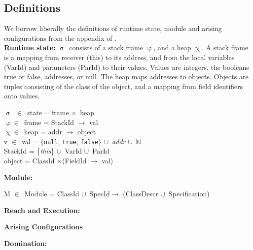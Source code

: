 \documentclass[a4paper,11pt, twoside,twocolumn]{article}
\newenvironment{logic}[1][null]
{\begin{flushleft} \small \label{#1}}
{\end{flushleft}}
\newcommand{\loin}{$\in$}
\newcommand{\losigma}{$\upsigma$}
\newcommand{\lochi}{$\upchi$}
\newcommand{\lophi}{$\upvarphi$}
\newcommand{\locup} {$\cup$}
\newcommand{\lotimes} {$\times$}
\newcommand{\ablock} {\null\qquad}
\begin{document}
\subsection{Definitions}\noindent
We borrow liberally the definitions of runtime state, module and arising configurations from the appendix of \cite{drossopoulou2015b}.\\
\textbf{Runtime state:}
 \losigma\ consists of a stack frame \lophi, and a heap \lochi. A stack frame is a mapping from receiver (this) to its address, and from the local variables (VarId) and parameters (ParId) to their values. Values are integers, the booleans true or false, addresses, or null. The heap maps addresses to objects. Objects are tuples consisting of the class of the object, and a mapping from field identifiers onto values.
\begin{logic}[Runtime state]
\losigma\ \loin\ state = frame \lotimes\ heap \\
\lophi \loin\ frame = StackId $\rightarrow$ val \\
\lochi \loin\ heap = addr $\rightarrow$ object \\
v \loin\ val = \{\texttt{null}, \texttt{true}, \texttt{false}\} \locup\ \textit{addr} \locup\ $\mathbb{N}$ \\
StackId = \{\textit{this}\} \locup\ VarId \locup\ ParId \\
object = ClassId \lotimes (FieldId $\rightarrow$ val)
\end{logic}
\textbf{Module:}
\begin{logic}[Module]
M \loin\ Module = ClassId \locup\ SpecId\linebreak\ablock\qquad\qquad\quad $\rightarrow$ \linebreak
\ablock \qquad \qquad \quad (ClassDescr \locup\ Specification)
\end{logic}

\textbf{Reach and Execution:}\\
\begin{logic}[Reach and Execution]\end{logic}



\textbf{Arising Configurations}\\
\begin{logic}[Arising]\end{logic}



\textbf{Domination:}\\
\begin{logic}[Domination]\end{logic}
\end{document}
